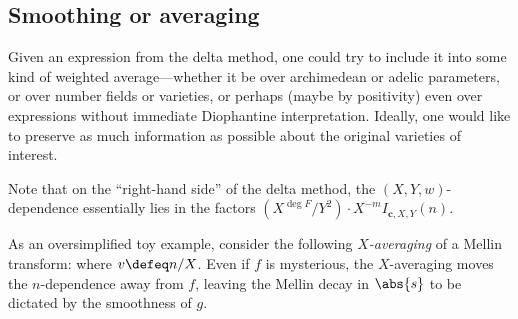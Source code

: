 \documentclass[12pt]{report}
\begin{document}
\subsection{Smoothing or averaging}

Given an expression from the delta method,
one could try to include it into some kind of weighted average---whether it be over archimedean or adelic parameters,
or over number fields or varieties,
or perhaps (maybe by positivity) even over expressions without immediate Diophantine interpretation.
Ideally,
one would like to preserve as much information as possible
about the original varieties of interest.


Note that on the ``right-hand side'' of the delta method,
the $(X,Y,w)$-dependence essentially lies in the factors $(X^{\deg{F}}/Y^2)
\cdot X^{-m}I_{\bm{c},X,Y}(n)$.


As an oversimplified toy example,
consider the following \emph{$X$-averaging} of a Mellin transform:
where $v\defeq n/X$.
Even if $f$ is mysterious,
the $X$-averaging moves the $n$-dependence away from $f$,
leaving the Mellin decay in $\abs{s}$ to be dictated by the smoothness of $g$.
\end{document}
